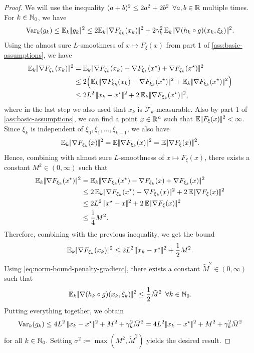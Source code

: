\begin{proof}
    We will use the inequality $(a + b)^2 \leq 2a^2 + 2b^2 \enspace\forall a,b\in\mathbb{R}$
    multiple times.
    For $k\in\mathbb{N}_0$, we have
    \[
        \operatorname{Var}_k(g_k)
        \leq \mathbb{E}_k|\!|g_k|\!|^2
        \leq 2\mathbb{E}_k|\!|\nabla F_{\xi_k}(x_k)|\!|^2
            + 2\gamma_k^2\, \mathbb{E}_k|\!|\nabla (h_k \circ g)(x_k, \xi_k)|\!|^2.
    \]
    Using the almost sure
    $L$-smoothness of $x\mapsto F_\xi(x)$ from part 1 of \cref{ass:basic-assumptions}, we have
    \begin{align*}
        \E_k\norm{\nabla F_{\xi_k}(x_k)}^2
        &=
        \E_k\norm{\nabla F_{\xi_k}(x_k) - \nabla F_{\xi_k}(x^\star) + \nabla F_{\xi_k}(x^\star)}^2 \\
        &\leq
        2\Big( \E_k\norm{\nabla F_{\xi_k}(x_k) - \nabla F_{\xi_k}(x^\star)}^2 + \E_k\norm{\nabla F_{\xi_k}(x^\star)}^2 \Big) \\
        &\leq 2 L^2\, \norm{x_k - x^\star}^2 + 2\,\E_k\norm{\nabla F_{\xi_k}(x^\star)}^2,
    \end{align*}
    where in the last step we also used that $x_k$ is $\mathcal{F}_k$-measurable.
    Also by part 1 of \cref{ass:basic-assumptions}, we can find a point $x\in\mathbb{R}^n$ such that
    $\mathbb{E}|\!|F_\xi(x)|\!|^2 < \infty$.
    Since $\xi_k$ is independent of $\xi_0, \xi_1, \dots, \xi_{k-1}$,
    we also have
    \[
        \mathbb{E}_k|\!|\nabla F_{\xi_k}(x)|\!|^2 = \mathbb{E}|\!|\nabla F_{\xi_k}(x)|\!|^2 = \mathbb{E}|\!|\nabla F_{\xi}(x)|\!|^2.
    \]
    Hence, combining with almost sure $L$-smoothness of $x\mapsto F_\xi(x)$, there exists a constant
    $M^2\in(0,\infty)$ such that
    \begin{align*}
        \E_k\norm{\nabla F_{\xi_k}(x^\star)}^2
        &=
        \E_k\norm{\nabla F_{\xi_k}(x^\star) - \nabla F_{\xi_k}(x) + \nabla F_{\xi_k}(x)}^2 \\
        &\leq
        2\, \E_k\norm{\nabla F_{\xi_k}(x^\star) - \nabla F_{\xi_k}(x)}^2 + 2\, \E\norm{\nabla F_{\xi}(x)}^2 \\
        &\leq
        2L^2\,\norm{x^\star - x}^2 + 2\,\E\norm{\nabla F_{\xi}(x)}^2 \\
        &\leq
        \frac{1}{4}M^2.
    \end{align*}
    Therefore, combining with the previous inequality, we get the bound
    \[
        \mathbb{E}_k|\!|\nabla F_{\xi_k}(x_k)|\!|^2 \leq 2 L^2\, |\!|x_k - x^\star|\!|^2 + \frac{1}{2} M^2.
    \]
    Using \eqref{eq:norm-bound-penalty-gradient},
    there exists a constant
    $\tilde{M}^2\in(0,\infty)$ such that
    \[
        \mathbb{E}_k|\!|\nabla (h_k \circ g)(x_k, \xi_k)|\!|^2 \leq \frac{1}{2}\tilde{M}^2 \enspace\forall k\in\mathbb{N}_0.
    \]
    Putting everything together, we obtain
    \[
        \operatorname{Var}_k(g_k)
        \leq 4 L^2\, |\!|x_k - x^\star|\!|^2 + M^2
            + \gamma_k^2 \tilde{M}^2
        = 4 L^2 |\!|x_k - x^\star|\!|^2
            + M^2 + \gamma_k^2 \tilde{M}^2
    \]
    for all $k\in\mathbb{N}_0$.
    Setting $\sigma^2 := \max(M^2, \tilde{M}^2)$ yields the desired result.
\end{proof}
